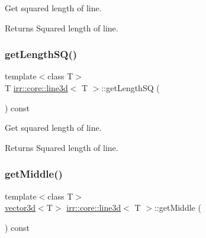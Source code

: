 Get squared length of line. 

\begin{DoxyReturn}{Returns}
Squared length of line. 
\end{DoxyReturn}
\mbox{\label{classirr_1_1core_1_1line3d_a4754398992c5922efe33cad0bf773ddc}} 
\subsubsection{\texorpdfstring{get\+Length\+S\+Q()}{getLengthSQ()}\hspace{0.1cm}{\footnotesize\ttfamily [2/2]}}
{\footnotesize\ttfamily template$<$class T$>$ \\
T \hyperlink{classirr_1_1core_1_1line3d}{irr\+::core\+::line3d}$<$ T $>$\+::get\+Length\+SQ (\begin{DoxyParamCaption}{ }\end{DoxyParamCaption}) const\hspace{0.3cm}{\ttfamily [inline]}}



Get squared length of line. 

\begin{DoxyReturn}{Returns}
Squared length of line. 
\end{DoxyReturn}
\mbox{\label{classirr_1_1core_1_1line3d_a14d8d80862836da4ecf51db9dcab95ee}} 
\subsubsection{\texorpdfstring{get\+Middle()}{getMiddle()}\hspace{0.1cm}{\footnotesize\ttfamily [1/2]}}
{\footnotesize\ttfamily template$<$class T$>$ \\
\hyperlink{classirr_1_1core_1_1vector3d}{vector3d}$<$T$>$ \hyperlink{classirr_1_1core_1_1line3d}{irr\+::core\+::line3d}$<$ T $>$\+::get\+Middle (\begin{DoxyParamCaption}{ }\end{DoxyParamCaption}) const\hspace{0.3cm}{\ttfamily [inline]}}



